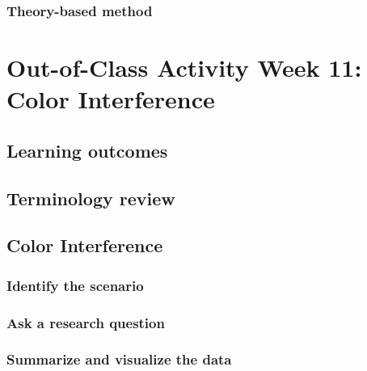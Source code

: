\documentclass[
]{report}
\begin{document}
\hypertarget{theory-based-method-2}{%
\subsubsection*{Theory-based method}\label{theory-based-method-2}}

\hypertarget{out-of-class-activity-week-11-color-interference}{%
\section{Out-of-Class Activity Week 11: Color Interference}\label{out-of-class-activity-week-11-color-interference}}

\hypertarget{learning-outcomes-20}{%
\subsection{Learning outcomes}\label{learning-outcomes-20}}

\hypertarget{terminology-review-17}{%
\subsection{Terminology review}\label{terminology-review-17}}

\hypertarget{color-interference}{%
\subsection{Color Interference}\label{color-interference}}

\hypertarget{identify-the-scenario}{%
\subsubsection*{Identify the scenario}\label{identify-the-scenario}}

\hypertarget{ask-a-research-question-2}{%
\subsubsection*{Ask a research question}\label{ask-a-research-question-2}}

\hypertarget{summarize-and-visualize-the-data-2}{%
\subsubsection*{Summarize and visualize the data}\label{summarize-and-visualize-the-data-2}}
\end{document}
